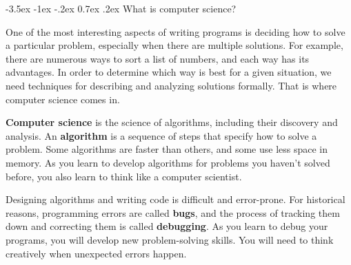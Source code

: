 \documentclass[12pt]{book}
\makeatletter
\theoremstyle{exercise}
\renewcommand{\section}{\@startsection{section}{1}{\z@}%
    {-3.5ex \@plus -1ex \@minus -.2ex}%
    {0.7ex \@plus.2ex}%
    {\normalfont\Large\bfseries}}
\makeatother
\begin{document}
\section{What is computer science?}

One of the most interesting aspects of writing programs is deciding how to solve a particular problem, especially when there are multiple solutions.
For example, there are numerous ways to sort a list of numbers, and each way has its advantages.
In order to determine which way is best for a given situation, we need techniques for describing and analyzing solutions formally.
That is where computer science comes in.


{\bf Computer science} is the science of algorithms, including their discovery and analysis.
An {\bf algorithm} is a sequence of steps that specify how to solve a problem.
Some algorithms are faster than others, and some use less space in memory.
As you learn to develop algorithms for problems you haven't solved before, you also learn to think like a computer scientist.


Designing algorithms and writing code is difficult and error-prone.
For historical reasons, programming errors are called {\bf bugs}, and the process of tracking them down and correcting them is called {\bf debugging}.
As you learn to debug your programs, you will develop new problem-solving skills.
You will need to think creatively when unexpected errors happen.



\end{document}
